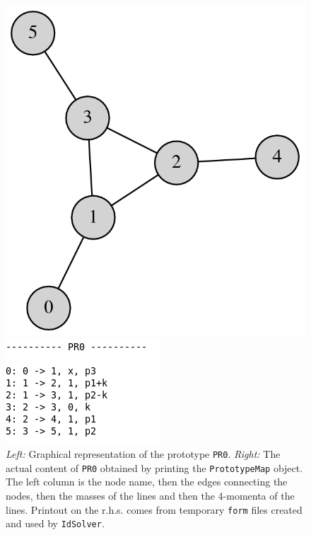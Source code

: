 \documentclass[a4paper,11pt]{article}
\begin{document}
\begin{figure}[t]
  \begin{center}
    \begin{minipage}[h]{0.25\textwidth}
    \includegraphics[width=\textwidth]{plots/PR0.png}
    \end{minipage}
    \hspace{100pt}
    \begin{minipage}[h]{0.25\textwidth}
    \includegraphics[width=\textwidth]{plots/PR0print.png}
    \end{minipage}
  \end{center}
  \caption{
  {\it Left:} Graphical representation of the prototype {\tt PR0}.
  {\it Right:} The actual content of {\tt PR0} obtained by printing the
  {\tt PrototypeMap} object. The left column is the node name, then the edges
  connecting the nodes, then the masses of the lines and then the 4-momenta of
  the lines.
  Printout on the r.h.s. comes from temporary {\tt form} files created and used
  by {\tt IdSolver}.
  }
  \label{fig:PR0}
\end{figure}
\end{document}

